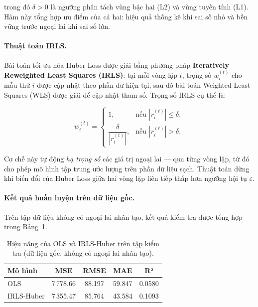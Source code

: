 \noindent trong đó $\delta > 0$ là ngưỡng phân tách vùng bậc hai (L2) và vùng tuyến tính (L1). Hàm này tổng hợp ưu điểm của cả hai: hiệu quả thống kê khi sai số nhỏ và bền vững trước ngoại lai khi sai số lớn.

\paragraph{Thuật toán IRLS.}
Bài toán tối ưu hóa Huber Loss được giải bằng phương pháp \textbf{Iteratively Reweighted Least Squares (IRLS)}: tại mỗi vòng lặp $t$, trọng số $w_i^{(t)}$ cho mẫu thứ $i$ được cập nhật theo phần dư hiện tại, sau đó bài toán Weighted Least Squares (WLS) được giải để cập nhật tham số. Trọng số IRLS cụ thể là:

\begin{equation}
    w_i^{(t)} =
    \begin{cases}
        1, & \text{nếu } |r_i^{(t)}| \le \delta, \\[4pt]
        \dfrac{\delta}{|r_i^{(t)}|}, & \text{nếu } |r_i^{(t)}| > \delta.
    \end{cases}
    \label{eq:irls_weight}
\end{equation}

\noindent Cơ chế này tự động \emph{hạ trọng số} các giá trị ngoại lai — qua từng vòng lặp, từ đó cho phép mô hình tập trung ước lượng trên phần dữ liệu sạch. Thuật toán dừng khi biến đổi của Huber Loss giữa hai vòng lặp liên tiếp thấp hơn ngưỡng hội tụ $\varepsilon$.

\paragraph{Kết quả huấn luyện trên dữ liệu gốc.}
Trên tập dữ liệu không có ngoại lai nhân tạo, kết quả kiểm tra được tổng hợp trong Bảng~\ref{tab:baseline_metrics}.

\begin{table}[htbp]
\centering
\caption{Hiệu năng của OLS và IRLS-Huber trên tập kiểm tra (dữ liệu gốc, không có ngoại lai nhân tạo).}
\label{tab:baseline_metrics}
\begin{tabular}{lcccc}
\toprule
\textbf{Mô hình} & \textbf{MSE} & \textbf{RMSE} & \textbf{MAE} & \textbf{R²} \\
\midrule
OLS          & 7\,778.66 & 88.197 & 59.847 & 0.0580 \\
IRLS-Huber   & 7\,355.47 & 85.764 & 43.584 & 0.1093 \\
\bottomrule
\end{tabular}
\end{table}

